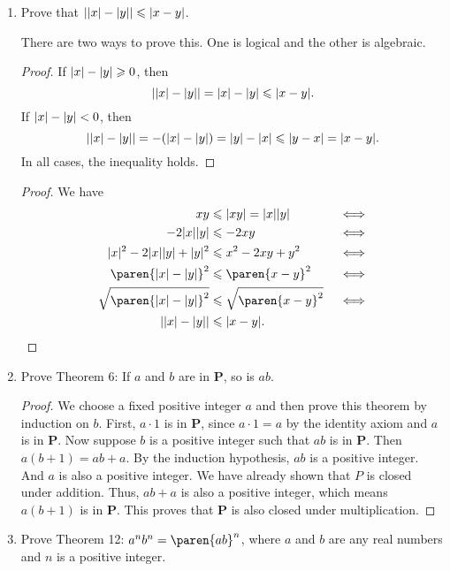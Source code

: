 \documentclass[a4paper]{article}
\begin{document}
\begin{enumerate}
\item Prove that \(\abs*{\abs x - \abs y} \le \abs{x - y}\).

  There are two ways to prove this.  One is logical and the other is
  algebraic.

  \begin{proof}
    If \(\abs x - \abs y \ge 0\), then
    \[
      \abs*{\abs x - \abs y} = \abs x - \abs y \le \abs{x - y}.
    \]
    If \(\lvert x\rvert - \lvert y\rvert < 0\), then
    \[
      \abs*{\abs x - \abs y} = - (\abs x - \abs y) = \abs y - \abs x \le \abs{y - x} = \abs{x - y}.
    \]
    In all cases, the inequality holds.
  \end{proof}

  \begin{proof}
    We have
    \begin{align*}
      xy &\le \abs{xy} = \abs x \abs y         && \iff \\
      -2\abs x\abs y
         &\le -2xy                             && \iff \\
      \abs x^2 - 2\abs x\abs y + \abs y^2
         &\le x^2 - 2xy + y^2                  && \iff \\
      \paren{\abs x - \abs y}^2
         &\le \paren{x - y}^2                  && \iff \\
      \sqrt{\paren{\abs x - \abs y}^2}
         &\le \sqrt{\paren{x - y}^2}           && \iff \\
      \abs*{\abs x - \abs y} &\le \abs{x - y}. && \qedhere
    \end{align*}
  \end{proof}

\item Prove Theorem 6: If \(a\) and \(b\) are in
  \(\mathbf{P}\), so is \(ab\).

  \begin{proof}
    We choose a fixed positive integer \(a\) and then prove this theorem
    by induction on \(b\).  First, \(a \cdot 1\) is in \(\mathbf{P}\),
    since \(a \cdot 1 = a\) by the identity axiom and \(a\) is in
    \(\mathbf{P}\).  Now suppose \(b\) is a positive integer such that
    \(ab\) is in \(\mathbf{P}\).  Then \(a(b+1) = ab + a \).  By the
    induction hypothesis, \(ab\) is a positive integer.  And \(a\) is also
    a positive integer.  We have already shown that \(P\) is closed under
    addition.  Thus, \(ab + a\) is also a positive integer, which means
    \(a(b+1)\) is in \(\mathbf{P}\).  This proves that \(\mathbf{P}\) is
    also closed under multiplication.
  \end{proof}
  
\item Prove Theorem 12: \(a^n b^n = \paren{ab}^n\), where \(a\) and \(b\) are any real numbers and \(n\)
  is a positive integer.
\end{enumerate}
\end{document}
